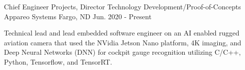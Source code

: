 

\begin{cventries}

  \cventry
    {Chief Engineer Projects, Director Technology Development/Proof-of-Concepts} %
    {Appareo Systems} %
    {Fargo, ND} %
    {Jun. 2020 - Present} %
    {
      \begin{cvitems} %
        \item {Technical lead and lead embedded software engineer on an AI enabled rugged aviation camera that used the NVidia Jetson Nano platform, 4K imaging, and Deep Neural Networks (DNN) for cockpit gauge recognition utilizing C/C++, Python, Tensorflow, and TensorRT.}
      \end{cvitems}
    }



\end{cventries}
